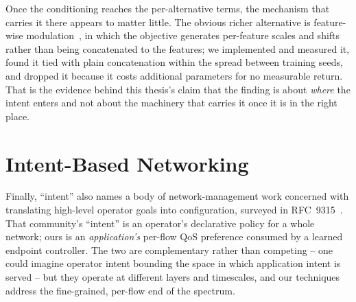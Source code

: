 Once the conditioning reaches the per-alternative terms, the mechanism that carries it there appears to
matter little. The obvious richer alternative is feature-wise modulation~\cite{Perez2018}, in which the
objective generates per-feature scales and shifts rather than being concatenated to the features; we
implemented and measured it, found it tied with plain concatenation within the spread between training
seeds, and dropped it because it costs additional parameters for no measurable return. That is the
evidence behind this thesis's claim that the finding is about \emph{where} the intent enters and not
about the machinery that carries it once it is in the right place.

\section{Intent-Based Networking}
\label{sec:rel:ibn}

Finally, ``intent'' also names a body of network-management work concerned with translating high-level
operator goals into configuration, surveyed in RFC~9315~\cite{RFC9315}. That community's ``intent'' is an
operator's declarative policy for a whole network; ours is an \emph{application's} per-flow QoS preference
consumed by a learned endpoint controller. The two are complementary rather than competing -- one could
imagine operator intent bounding the space in which application intent is served -- but they operate at
different layers and timescales, and our techniques address the fine-grained, per-flow end of the spectrum.
